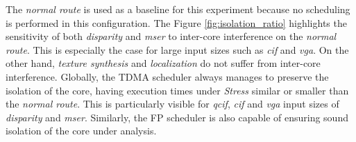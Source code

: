 The \emph{normal route} is used as a baseline for this experiment
because no scheduling is performed in this configuration.
The Figure \ref{fig:isolation_ratio} highlights the sensitivity of both
\emph{disparity} and \emph{mser} to inter-core interference on the
\emph{normal route}. This is especially the case for large input sizes
such as \emph{cif} and \emph{vga}. On the other hand, \emph{texture
synthesis} and \emph{localization} do not suffer from inter-core
interference.
Globally, the TDMA scheduler always manages to preserve the isolation of
the core, having execution times under \emph{Stress} similar or smaller than the \emph{normal route}. This is particularly visible for \emph{qcif}, \emph{cif} and \emph{vga} input sizes of \emph{disparity} and \emph{mser}.
Similarly, the FP scheduler is also capable of ensuring sound
isolation of the core under analysis.

